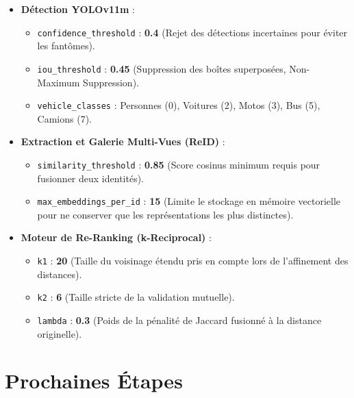 \documentclass[12pt, a4paper]{article}
\begin{document}
\begin{itemize}
    \item \textbf{Détection YOLOv11m} :
    \begin{itemize}
        \item \texttt{confidence\_threshold} : \textbf{0.4} (Rejet des détections incertaines pour éviter les fantômes).
        \item \texttt{iou\_threshold} : \textbf{0.45} (Suppression des boîtes superposées, Non-Maximum Suppression).
        \item \texttt{vehicle\_classes} : Personnes (0), Voitures (2), Motos (3), Bus (5), Camions (7).
    \end{itemize}
    \item \textbf{Extraction et Galerie Multi-Vues (ReID)} :
    \begin{itemize}
        \item \texttt{similarity\_threshold} : \textbf{0.85} (Score cosinus minimum requis pour fusionner deux identités).
        \item \texttt{max\_embeddings\_per\_id} : \textbf{15} (Limite le stockage en mémoire vectorielle pour ne conserver que les représentations les plus distinctes).
    \end{itemize}
    \item \textbf{Moteur de Re-Ranking (k-Reciprocal)} :
    \begin{itemize}
        \item \texttt{k1} : \textbf{20} (Taille du voisinage étendu pris en compte lors de l'affinement des distances).
        \item \texttt{k2} : \textbf{6} (Taille stricte de la validation mutuelle).
        \item \texttt{lambda} : \textbf{0.3} (Poids de la pénalité de Jaccard fusionné à la distance originelle).
    \end{itemize}
\end{itemize}

\section{Prochaines Étapes}
\end{document}
